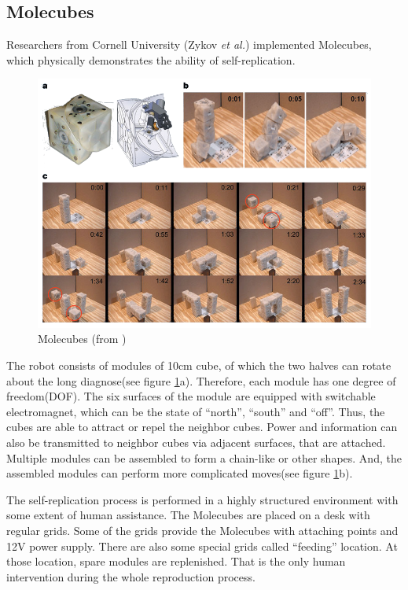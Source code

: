 \documentclass[12pt,twoside]{article}
\theoremstyle{plain}
\theoremstyle{definition}
\theoremstyle{remark}
\newcommand{\etal}{\textit{et al.}}
\begin{document}
\subsection{Molecubes}
Researchers from Cornell University (Zykov \etal) implemented Molecubes, which physically demonstrates the ability of self-replication\cite{zykov_self-reproducing_2005}\cite{zykov_evolved_2007}. 

\begin{figure}[t]
	 \centerline{\includegraphics[width=\textwidth]{molecubes}}
	 {\caption{Molecubes (from \cite{zykov_self-reproducing_2005})}
	 \label{fig:mole}}
\end{figure}

The robot consists of modules of 10cm cube, of which the two halves can rotate about the long diagnose(see figure \ref{fig:mole}a). Therefore, each module has one degree of freedom(DOF). The six surfaces of the module are equipped with switchable electromagnet, which can be the state of ``north'', ``south'' and ``off''. Thus, the cubes are able to attract or repel the neighbor cubes. Power and information can also be transmitted to neighbor cubes via adjacent surfaces, that are attached. Multiple modules can be assembled to form a chain-like or other shapes. And, the assembled modules can perform more complicated moves(see figure \ref{fig:mole}b). 

The self-replication process is performed in a highly structured environment with some extent of human assistance. The Molecubes are placed on a desk with regular grids. Some of the grids provide the Molecubes with attaching points and 12V power supply. There are also some special grids called ``feeding'' location. At those location, spare modules are replenished. That is the only human intervention during the whole reproduction process.
\end{document}
